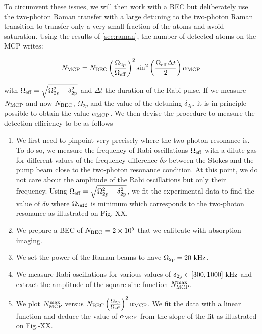 To circumvent these issues, we will then work with a BEC but deliberately use the two-photon Raman transfer with a large detuning to the two-photon Raman transition to transfer only a very small fraction of the atoms and avoid saturation. Using the results of \ref{sec:raman}, the number of detected atoms on the MCP writes:

\begin{equation}
    N_{\rm{MCP}}=N_{\rm{BEC}} \left(\frac{\Omega_{2 p}}{\Omega_{\rm{eff}}}\right)^{2} \sin ^{2}\left(\frac{\Omega_{\rm{eff}}  \Delta t}{2}\right) \alpha_{\rm{MCP}}
\end{equation}

\noindent with  $\Omega_{\rm{eff}}= \sqrt{\Omega_{2p}^2 + \delta_{\rm{2p}}^2}$ and $\Delta t$ the duration of the Rabi pulse. If we measure $N_{\rm{MCP}}$ and now $N_{\rm{BEC}}$, $\Omega_{2p}$ and the value of the detuning  $\delta_{2p}$, it is in principle possible to obtain the value $\alpha_{\rm{MCP}}$. We then devise the procedure to measure the detection efficiency to be as follows

\begin{enumerate}
    \item We first need to pinpoint very precisely where the two-photon resonance is. To do so, we measure the frequency of Rabi oscillations $\Omega_{\rm{eff}}$ with a dilute gas for different values of the frequency difference $\delta \nu$ between the Stokes and the pump beam close to the two-photon resonance condition. At this point, we do not care about the amplitude of the Rabi oscillations but only their frequency. Using $\Omega_{\rm{eff}}= \sqrt{\Omega_{2p}^2 + \delta_{\rm{2p}}^2}$, we fit the experimental data to find the value of $\delta \nu$ where $\Omega_{\eff}$ is minimum which corresponds to the two-photon resonance as illustrated on Fig.-XX.
    \item We prepare a BEC of $N_{\rm{BEC}} = 2 \times 10^5$ that we calibrate with absorption imaging.
    \item We set the power of the Raman beams to have $\Omega_{\rm{2p}}=20 \ \rm{kHz}$.
    \item We measure Rabi oscillations for various values of $\delta_{\rm{2p}} \in [300,1000] \ \rm{kHz}$ and extract the amplitude of the square sine function $N^{\rm{max}}_{\rm{MCP}}$.
    \item We plot $N^{\rm{max}}_{\rm{MCP}}$ versus $N_{\rm{BEC}} \left(\frac{\Omega_{2 p}}{\Omega_{\rm{eff}}}\right)^{2} \alpha_{\rm{MCP}}$. We fit the data with a linear function and deduce the value of $\alpha_{\rm{MCP}}$ from the slope of the fit as illustrated on Fig.-XX.
\end{enumerate}

